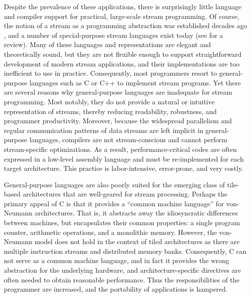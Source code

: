\documentclass[final]{ijpp}
\begin{document}
Despite the  prevalence of  these applications, there  is surprisingly
little language and compiler support for practical, large-scale stream
programming.   Of course,  the notion  of  a stream  as a  programming
abstraction was  established decades ago \cite{SICP}, and  a number of
special-purpose stream languages  exist today (see \cite{survey97} for
a review).   Many of these  languages and representations  are elegant
and theoretically sound,  but they are not flexible  enough to support
straightforward development  of modern stream  applications, and their
implementations are too inefficient to use in practice.  Consequently,
most programmers resort to general-purpose  languages such as C or C++
to  implement stream  programs.   Yet there  are  several reasons  why
general-purpose languages are  inadequate for stream programming. Most
notably, they do not provide  a natural or intuitive representation of
streams,  thereby  reducing  readability, robustness,  and  programmer
productivity.   Moreover,  because   the  widespread  parallelism  and
regular communication  patterns of data  streams are left  implicit in
general-purpose  languages,  compilers  are not  stream-conscious  and
cannot   perform   stream-specific   optimizations.   As   a   result,
performance-critical codes are often expressed in a low-level assembly
language  and must  be  re-implemented for  each target  architecture.
This practice is labor-intensive, error-prone, and very costly.

General-purpose  languages are  also  poorly suited  for the  emerging
class of  tile-based architectures \cite{smartmemories,rawshort,trips}
that  are  well-geared for  stream  processing.   Perhaps the  primary
appeal  of C is  that it  provides a  ``common machine  language'' for
von-Neumann   architectures.    That  is,   it   abstracts  away   the
idiosyncratic  differences between  machines,  but encapsulates  their
common  properties: a single  program counter,  arithmetic operations,
and a monolithic memory.  However, the von-Neumann model does not hold
in  the   context  of  tiled  architectures  as   there  are  multiple
instruction streams and distributed  memory banks. Consequently, C can
not serve  as a common machine  language, and in fact  it provides the
wrong    abstraction     for    the    underlying     hardware,    and
architecture-specific directives are often needed to obtain reasonable
performance.   Thus   the  responsibilities  of   the  programmer  are
increased, and the portability of applications is hampered.
\end{document}
